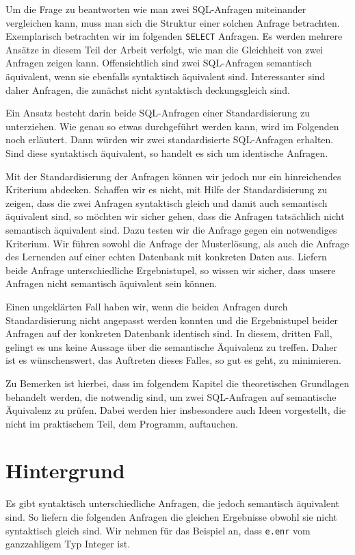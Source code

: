 Um die Frage zu beantworten wie man zwei SQL-Anfragen miteinander vergleichen kann, muss man sich die Struktur einer solchen Anfrage betrachten. Exemplarisch betrachten wir im folgenden \verb|SELECT| Anfragen. Es werden mehrere Ansätze in diesem Teil der Arbeit verfolgt, wie man die Gleichheit von zwei Anfragen zeigen kann. Offensichtlich sind zwei SQL-Anfragen semantisch äquivalent, wenn sie ebenfalls syntaktisch äquivalent sind. Interessanter sind daher Anfragen, die zunächst nicht syntaktisch deckungsgleich sind. 

Ein Ansatz besteht darin beide SQL-Anfragen einer Standardisierung zu unterziehen. Wie genau so etwas durchgeführt werden kann, wird im Folgenden noch erläutert. Dann würden wir zwei standardisierte SQL-Anfragen erhalten. Sind diese syntaktisch äquivalent, so handelt es sich um identische Anfragen. 

Mit der Standardisierung der Anfragen können wir jedoch nur ein hinreichendes Kriterium abdecken. Schaffen wir es nicht, mit Hilfe der Standardisierung zu zeigen, dass die zwei Anfragen syntaktisch gleich und damit auch semantisch äquivalent sind, so möchten wir sicher gehen, dass die Anfragen tatsächlich nicht semantisch äquivalent sind. Dazu testen wir die Anfrage gegen ein notwendiges Kriterium. Wir führen sowohl die Anfrage der Musterlösung, als auch die Anfrage des Lernenden auf einer echten Datenbank mit konkreten Daten aus. Liefern beide Anfrage unterschiedliche Ergebnistupel, so wissen wir sicher, dass unsere Anfragen nicht semantisch äquivalent sein können. 

Einen ungeklärten Fall haben wir, wenn die beiden Anfragen durch Standardisierung nicht angepasst werden konnten und die Ergebnistupel beider Anfragen auf der konkreten Datenbank identisch sind. In diesem, dritten Fall, gelingt es uns keine Aussage über die semantische Äquivalenz zu treffen. Daher ist es wünschenswert, das Auftreten dieses Falles, so gut es geht, zu minimieren.

Zu Bemerken ist hierbei, dass im folgendem Kapitel die theoretischen Grundlagen behandelt werden, die notwendig sind, um zwei SQL-Anfragen auf semantische Äquivalenz zu prüfen. Dabei werden hier insbesondere auch Ideen vorgestellt, die nicht im praktischem Teil, dem Programm, auftauchen. 

\section{Hintergrund}

Es gibt syntaktisch unterschiedliche Anfragen, die jedoch semantisch äquivalent sind. So liefern die folgenden Anfragen die gleichen Ergebnisse obwohl sie nicht syntaktisch gleich sind. Wir nehmen für das Beispiel an, dass \verb|e.enr| vom ganzzahligem Typ Integer ist.


